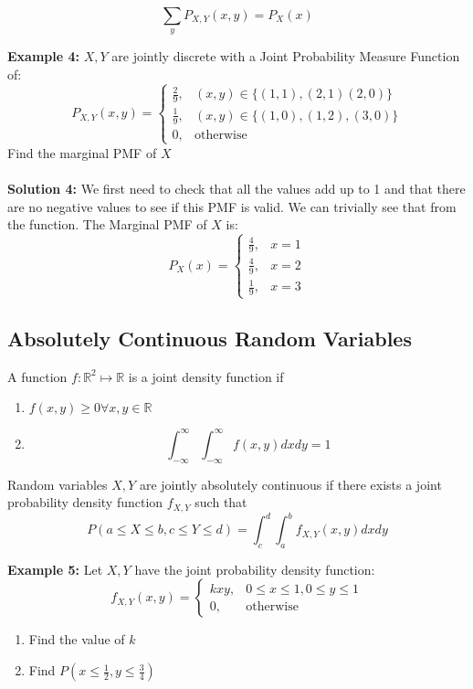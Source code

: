 \documentclass[12pt, twoside]{article}
\begin{document}
\begin{tcolorbox}[title=Marginal Probability Measure Function of $X$]
	$$\sum_y P_{X,Y} (x,y) = P_X (x)$$
\end{tcolorbox}

\textbf{Example 4:} $X,Y$ are jointly discrete with a Joint Probability Measure Function of:
$$P_{X,Y} (x,y) = \begin{cases}
	\frac{2}{9}, & (x,y) \in \{ (1,1), (2,1) (2,0) \}\\
	\frac{1}{9}, & (x,y)\in \{ (1,0), (1,2), (3,0) \}\\
	0, & \text{otherwise}
\end{cases}$$ Find the marginal PMF of $X$\\
\\
\textbf{Solution 4:} We first need to check that all the values add up to 1 and that there are no negative values to see if this PMF is valid. We can trivially see that from the function. The Marginal PMF of $X$ is:
$$P_X (x) = \begin{cases}
	\frac{4}{9}, & x = 1\\
	\frac{4}{9}, & x = 2\\
	\frac{1}{9}, & x = 3
\end{cases}
$$

\subsection{Absolutely Continuous Random Variables}

\begin{tcolorbox}[title=Definition: Joint Density Function]
	A function $f:\mathbb{R}^2 \mapsto \mathbb{R}$ is a joint density function if
	\begin{enumerate}
		\item{$f(x,y) \geq 0 \forall x,y\in\mathbb{R}$}
		\item{$$\int^{\infty}_{-\infty} \int^{\infty}_{-\infty} f(x,y) dx dy  = 1$$}
	\end{enumerate}
\end{tcolorbox}

\begin{tcolorbox}[title=Definition: Jointly Absolutely Continuous Random Variables]
	Random variables $X,Y$ are jointly absolutely continuous if there exists a joint probability density function $f_{X,Y}$ such that
	$$P(a \leq X \leq b, c \leq Y \leq d) = \int^d_c \int^b_a f_{X,Y}(x,y) dx dy$$
\end{tcolorbox}

\textbf{Example 5:} Let $X,Y$ have the joint probability density function: $$f_{X,Y} (x,y) = \begin{cases}
	kxy, & 0 \leq x \leq 1, 0 \leq y \leq 1\\
	0, & \text{otherwise}
\end{cases}
$$
\begin{enumerate}
	\item{Find the value of $k$}
	\item{Find $P(x \leq \frac{1}{2}, y \leq \frac{3}{4})$}
\end{enumerate}
\end{document}
